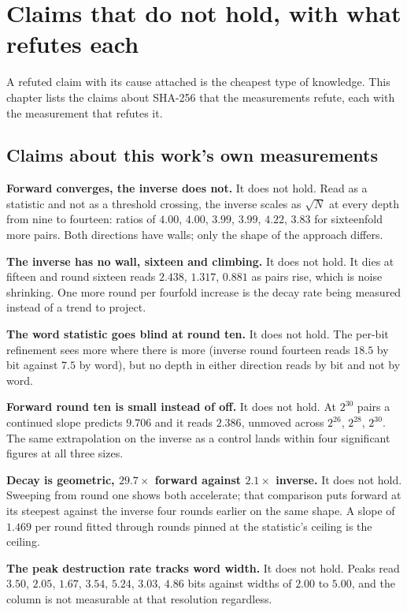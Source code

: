 \chapter{Claims that do not hold, with what refutes each}

A refuted claim with its cause attached is the cheapest type of knowledge. This chapter lists the claims about SHA-256 that the measurements refute, each with the measurement that refutes it.

\section{Claims about this work's own measurements}

\textbf{Forward converges, the inverse does not.} It does not hold. Read as a statistic and not as a threshold crossing, the inverse scales as \(\sqrt{N}\) at every depth from nine to fourteen: ratios of \(4.00\), \(4.00\), \(3.99\), \(3.99\), \(4.22\), \(3.83\) for sixteenfold more pairs. Both directions have walls; only the shape of the approach differs.

\textbf{The inverse has no wall, sixteen and climbing.} It does not hold. It dies at fifteen and round sixteen reads \(2.438\), \(1.317\), \(0.881\) as pairs rise, which is noise shrinking. One more round per fourfold increase is the decay rate being measured instead of a trend to project.

\textbf{The word statistic goes blind at round ten.} It does not hold. The per-bit refinement sees more where there is more (inverse round fourteen reads \(18.5\) by bit against \(7.5\) by word), but no depth in either direction reads by bit and not by word.

\textbf{Forward round ten is small instead of off.} It does not hold. At \(2^{30}\) pairs a continued slope predicts \(9.706\) and it reads \(2.386\), unmoved across \(2^{26}\), \(2^{28}\), \(2^{30}\). The same extrapolation on the inverse as a control lands within four significant figures at all three sizes.

\textbf{Decay is geometric, \(29.7\times\) forward against \(2.1\times\) inverse.} It does not hold. Sweeping from round one shows both accelerate; that comparison puts forward at its steepest against the inverse four rounds earlier on the same shape. A slope of \(1.469\) per round fitted through rounds pinned at the statistic's ceiling is the ceiling.

\textbf{The peak destruction rate tracks word width.} It does not hold. Peaks read \(3.50\), \(2.05\), \(1.67\), \(3.54\), \(5.24\), \(3.03\), \(4.86\) bits against widths of \(2.00\) to \(5.00\), and the column is not measurable at that resolution regardless.

